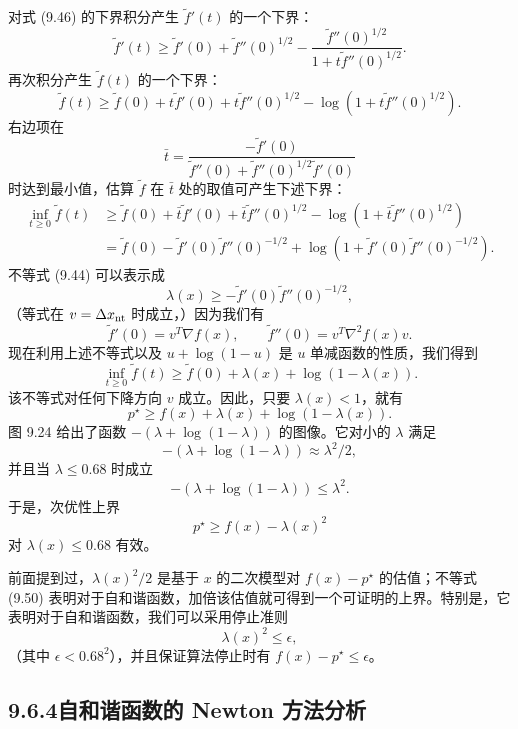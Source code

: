 \documentclass[UTF8, 12pt, fontset=fandol, oneside]{ctexart}
\begin{document}
对式 (9.46) 的下界积分产生 $\tilde{f}'(t)$ 的一个下界：
\begin{equation}
\tilde{f}'(t)\geq \tilde{f}'(0)+\tilde{f}''(0)^{1/2}-
\frac{\tilde{f}''(0)^{1/2}}{1+t\tilde{f}''(0)^{1/2}}.
\tag{9.47}
\end{equation}
再次积分产生 $\tilde{f}(t)$ 的一个下界：
\begin{equation}
\tilde{f}(t)\geq \tilde{f}(0)+t\tilde{f}'(0)+t\tilde{f}''(0)^{1/2}
-\log(1+t\tilde{f}''(0)^{1/2}).
\tag{9.48}
\end{equation}
右边项在
\[
\bar{t}=\frac{-\tilde{f}'(0)}{\tilde{f}''(0)+\tilde{f}''(0)^{1/2}\tilde{f}'(0)}
\]
时达到最小值，估算 $\tilde{f}$ 在 $\bar{t}$ 处的取值可产生下述下界：
\[
\begin{aligned}
\inf_{t\geq0}\tilde{f}(t)
&\geq \tilde{f}(0)+\bar{t}\tilde{f}'(0)+\bar{t}\tilde{f}''(0)^{1/2}
-\log(1+\bar{t}\tilde{f}''(0)^{1/2})\\
&=\tilde{f}(0)-\tilde{f}'(0)\tilde{f}''(0)^{-1/2}
+\log(1+\tilde{f}'(0)\tilde{f}''(0)^{-1/2}).
\end{aligned}
\]
不等式 (9.44) 可以表示成
\[
\lambda(x)\geq -\tilde{f}'(0)\tilde{f}''(0)^{-1/2},
\]
（等式在 $v=\Delta x_{\rm nt}$ 时成立，）因为我们有
\[
\tilde{f}'(0)=v^T\nabla f(x),\qquad
\tilde{f}''(0)=v^T\nabla^2 f(x)v.
\]
现在利用上述不等式以及 $u+\log(1-u)$ 是 $u$ 单减函数的性质，我们得到
\[
\inf_{t\geq0}\tilde{f}(t)\geq \tilde{f}(0)+\lambda(x)+\log(1-\lambda(x)).
\]
该不等式对任何下降方向 $v$ 成立。因此，只要 $\lambda(x)<1$，就有
\begin{equation}
p^\star\geq f(x)+\lambda(x)+\log(1-\lambda(x)).
\tag{9.49}
\end{equation}
图 9.24 给出了函数 $-(\lambda+\log(1-\lambda))$ 的图像。它对小的 $\lambda$ 满足
\[
-(\lambda+\log(1-\lambda))\approx \lambda^2/2,
\]
并且当 $\lambda\leq0.68$ 时成立
\[
-(\lambda+\log(1-\lambda))\leq \lambda^2.
\]
于是，次优性上界
\begin{equation}
p^\star\geq f(x)-\lambda(x)^2
\tag{9.50}
\end{equation}
对 $\lambda(x)\leq0.68$ 有效。

前面提到过，$\lambda(x)^2/2$ 是基于 $x$ 的二次模型对 $f(x)-p^\star$ 的估值；不等式 (9.50) 表明对于自和谐函数，加倍该估值就可得到一个可证明的上界。特别是，它表明对于自和谐函数，我们可以采用停止准则
\[
\lambda(x)^2\leq\epsilon,
\]
（其中 $\epsilon<0.68^2$），并且保证算法停止时有 $f(x)-p^\star\leq\epsilon$。

\subsection*{9.6.4\quad 自和谐函数的 Newton 方法分析}
\end{document}
